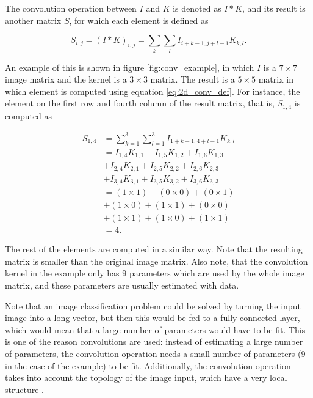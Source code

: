 The convolution operation between $I$ and $K$ is denoted as $I * K$, and its result is another matrix $S$, for which each element is defined as

\begin{equation}
  \label{eq:2d_conv_def}
  S_{i,j} = (I * K)_{i,j} = \sum_{k} \sum_{l} I_{i+k-1,j+l-1} K_{k, l}.
\end{equation}

An example of this is shown in figure \ref{fig:conv_example}, in which $I$ is a $7 \times 7$ image matrix and the kernel is a $3 \times 3$ matrix. The result is a $5 \times 5$ matrix in which element is computed using equation \ref{eq:2d_conv_def}. For instance, the element on the first row and fourth column of the result matrix, that is, $S_{1,4}$ is computed as

\begin{equation}
  \begin{split}
      S_{1,4} & =
      \sum_{k=1}^3 \sum_{l=1}^3 I_{1+k-1,4+l-1} K_{k, l} \\
      & = I_{1,4}K_{1,1} + I_{1,5}K_{1,2} + I_{1,6}K_{1,3} \\
      & + I_{2,4}K_{2,1} + I_{2,5}K_{2,2} + I_{2,6}K_{2,3} \\
      & + I_{3,4}K_{3,1} + I_{3,5}K_{3,2} + I_{3,6}K_{3,3} \\
      & = ( 1 \times 1 ) + ( 0 \times 0 ) + ( 0 \times 1 ) \\
      & + ( 1 \times 0 ) + ( 1 \times 1 ) + ( 0 \times 0 ) \\
      & + ( 1 \times 1 ) + ( 1 \times 0 ) + ( 1 \times 1 ) \\
      & = 4.
  \end{split}
\end{equation}

The rest of the elements are computed in a similar way. Note that the resulting matrix is smaller than the original image matrix. Also note, that the convolution kernel in the example only has 9 parameters which are used by the whole image matrix, and these parameters are usually estimated with data.

Note that an image classification problem could be solved by turning the input image into a long vector, but then this would be fed to a fully connected layer, which would mean that a large number of parameters would have to be fit. This is one of the reason convolutions are used: instead of estimating a large number of parameters, the convolution operation needs a small number of parameters (9 in the case of the example) to be fit. Additionally, the convolution operation takes into account the topology of the image input, which have a very local structure \cite{lecun1998gradient}.

